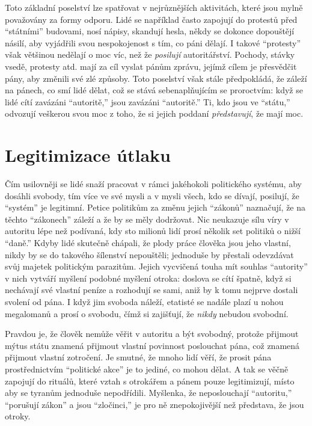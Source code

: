 \documentclass{book}
\begin{document}
Toto základní poselství lze spatřovat v nejrůznějších aktivitách, které jsou mylně považovány za formy odporu. Lidé se například často zapojují do protestů před \enquote{státními} budovami, nosí nápisy, skandují hesla, někdy se dokonce dopouštějí násilí, aby vyjádřili svou nespokojenost s tím, co páni dělají. I takové \enquote{protesty} však většinou nedělají o moc víc, než že \emph{posilují} autoritářství. Pochody, stávky vsedě, protesty atd. mají za cíl vyslat pánům zprávu, jejímž cílem je přesvědčit pány, aby změnili své zlé způsoby. Toto poselství však stále předpokládá, že záleží na pánech, co smí lidé dělat, což se stává sebenaplňujícím se proroctvím: když se lidé cítí zavázáni \enquote{autoritě,} jsou zavázáni \enquote{autoritě.} Ti, kdo jsou ve \enquote{státu,} odvozují veškerou svou moc z toho, že si jejich poddaní \emph{představují}, že mají moc.

\section{Legitimizace útlaku}

Čím usilovněji se lidé snaží pracovat v rámci jakéhokoli politického systému, aby dosáhli svobody, tím více ve své mysli a v mysli všech, kdo se dívají, posilují, že \enquote{systém} je legitimní. Petice politikům za změnu jejich \enquote{zákonů} naznačují, že na těchto \enquote{zákonech} záleží a že by se měly dodržovat. Nic neukazuje sílu víry v autoritu lépe než podívaná, kdy sto milionů lidí prosí několik set politiků o nižší \enquote{daně.} Kdyby lidé skutečně chápali, že plody práce člověka jsou jeho vlastní, nikdy by se do takového šílenství nepouštěli; jednoduše by přestali odevzdávat svůj majetek politickým parazitům. Jejich vycvičená touha mít souhlas \enquote{autority} v nich vytváří myšlení podobné myšlení otroka: doslova se cítí špatně, když si nechávají své vlastní peníze a rozhodují se sami, aniž by k tomu nejprve dostali svolení od pána. I když jim svoboda náleží, etatisté se nadále plazí u nohou megalomanů a prosí o svobodu, čímž si zajišťují, že \emph{nikdy} nebudou svobodní.

Pravdou je, že člověk nemůže věřit v autoritu a být svobodný, protože přijmout mýtus státu znamená přijmout vlastní povinnost poslouchat pána, což znamená přijmout vlastní zotročení. Je smutné, že mnoho lidí věří, že prosit pána prostřednictvím \enquote{politické akce} je to jediné, co mohou dělat. A tak se věčně zapojují do rituálů, které vztah s otrokářem a pánem pouze legitimizují, místo aby se tyranům jednoduše nepodřídili. Myšlenka, že neposlouchají \enquote{autoritu,} \enquote{porušují zákon} a jsou \enquote{zločinci,} je pro ně znepokojivější než představa, že jsou otroky.
\end{document}
